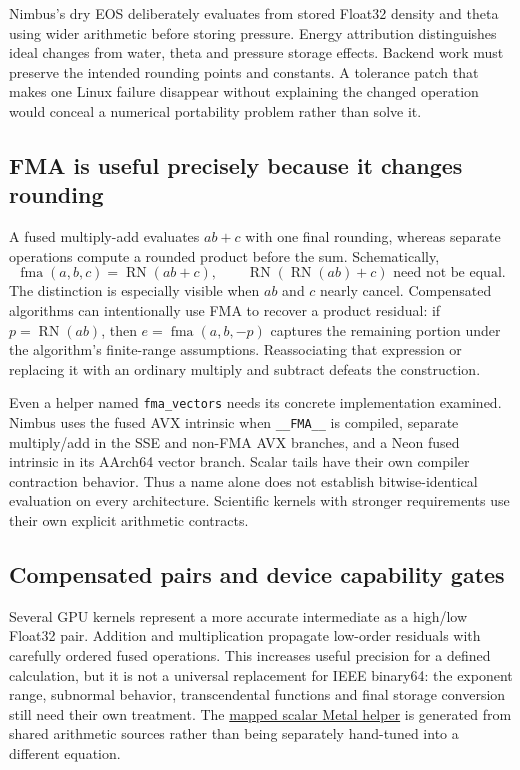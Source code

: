 Nimbus's dry EOS deliberately evaluates from stored Float32 density and theta
using wider arithmetic before storing pressure. Energy attribution distinguishes
ideal changes from water, theta and pressure storage effects. Backend work must
preserve the intended rounding points and constants. A tolerance patch that
makes one Linux failure disappear without explaining the changed operation
would conceal a numerical portability problem rather than solve it.

\subsection{FMA is useful precisely because it changes rounding}

A fused multiply-add evaluates $ab+c$ with one final rounding, whereas separate
operations compute a rounded product before the sum. Schematically,
\[
 \operatorname{fma}(a,b,c)=\operatorname{RN}(ab+c),\qquad
 \operatorname{RN}(\operatorname{RN}(ab)+c)
 \text{ need not be equal.}
\]
The distinction is especially visible when $ab$ and $c$ nearly cancel.
Compensated algorithms can intentionally use FMA to recover a product residual:
if $p=\operatorname{RN}(ab)$, then $e=\operatorname{fma}(a,b,-p)$ captures the
remaining portion under the algorithm's finite-range assumptions. Reassociating
that expression or replacing it with an ordinary multiply and subtract defeats
the construction.

Even a helper named \texttt{fma\_vectors} needs its concrete implementation
examined. Nimbus uses the fused AVX intrinsic when \texttt{\_\_FMA\_\_} is
compiled, separate multiply/add in the SSE and non-FMA AVX branches, and a
Neon fused intrinsic in its AArch64 vector branch. Scalar tails have their
own compiler contraction behavior. Thus a name alone does not establish
bitwise-identical evaluation on every architecture. Scientific kernels with
stronger requirements use their own explicit arithmetic contracts.

\subsection{Compensated pairs and device capability gates}

Several GPU kernels represent a more accurate intermediate as a high/low
Float32 pair. Addition and multiplication propagate low-order residuals with
carefully ordered fused operations. This increases useful precision for a
defined calculation, but it is not a universal replacement for IEEE binary64:
the exponent range, subnormal behavior, transcendental functions and final
storage conversion still need their own treatment. The
\href{../metal/include/compute/metal/shaders/terrain/mapped_scalar_math_msl.hpp}{mapped
scalar Metal helper} is generated from shared arithmetic sources rather than
being separately hand-tuned into a different equation.

